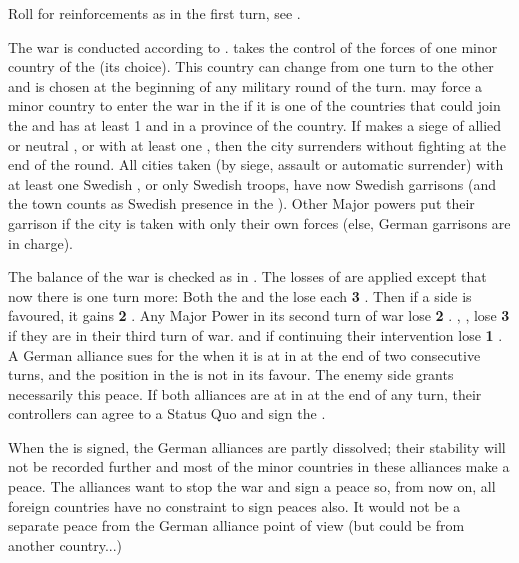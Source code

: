 \phadm
\aparag Roll for reinforcements as in the first turn, see
.

\phmil
\aparag The war is conducted according to .
\aparag \SUE takes the control of the forces of one minor country of the
\alliance (its choice). This country can change from one turn to the other and
is chosen at the beginning of any military round of the turn.
\aparag \SUE may force a minor country to enter the war in the \alliance if it
is one of the countries that could join the \alliance and \SUE has at least 1
\ARMY\faceplus and  in a province of the country.
\aparag If \SUE makes a siege of allied or neutral \provinceMecklenburg,
 or  with at least one \ARMY
\faceplus, then the city surrenders without fighting at the end of the round.
\aparag All cities taken (by siege, assault or automatic surrender) with at
least one Swedish \ARMY, or only Swedish troops, have now Swedish garrisons
(and the town counts as Swedish presence in the \HRE).  Other Major powers put
their garrison if the city is taken with only their own forces (else, German
garrisons are in charge).

\phpaix
\aparag The balance of the war is checked as in .  The losses of \STAB are applied except that now there is one turn
more:
\bparag Both the \alliance and the \ligue lose each {\bf 3} \STAB.
\bparag Then if a side is favoured, it gains {\bf 2} \STAB.
\bparag Any Major Power in its second turn of war lose {\bf 2} \STAB.
\bparag \SPA, \HOL, \AUS lose {\bf 3} \STAB if they are in their third turn of
war.
\bparag \SUE and \ENG if continuing their intervention lose {\bf 1} \STAB.
\label{pIV:TYW:Suing turn 2}
\bparag A German alliance sues for the  when it
is at  in \STAB at the end of two consecutive turns, and the
position in the \HRE is not in its favour. The enemy side grants necessarily
this peace.
\bparag If both alliances are at  in \STAB at the end of any turn,
their controllers can agree to a Status Quo and sign the
.

\bparag When the  is signed, the German
alliances are partly dissolved; their stability will not be recorded further
and most of the minor countries in these alliances make a peace.  The
alliances want to stop the war and sign a peace so, from now on, all foreign
countries have no constraint to sign peaces also. It would not be a separate
peace from the German alliance point of view (but could be from another
country...)

